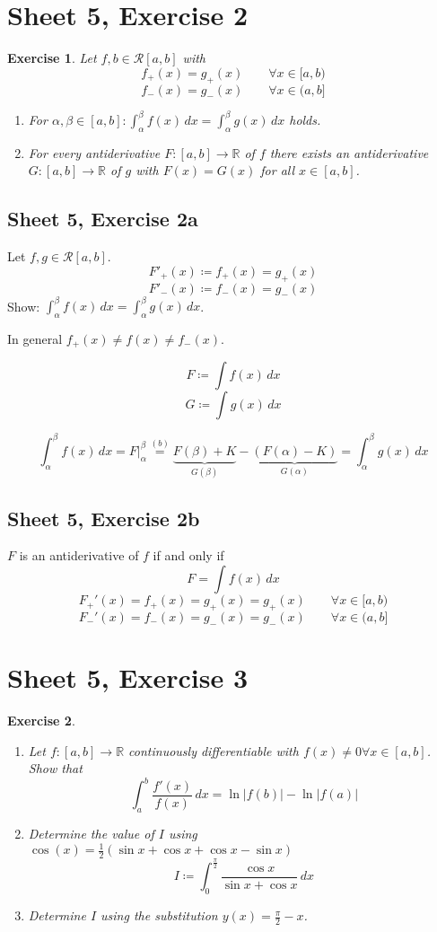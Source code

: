 \documentclass{article}
\newtheorem{ex}{Exercise} %
\newcommand{\card}[1]{\left|#1\right|}
\begin{document}
\section{Sheet 5, Exercise 2}
\begin{ex}
  Let $f, b \in \mathcal R[a,b]$ with
  \[ f_+(x) = g_+(x) \qquad \forall x \in [a,b) \]
  \[ f_-(x) = g_-(x) \qquad \forall x \in (a,b] \]
  \begin{enumerate}
    \item For $\alpha,\beta \in [a,b]: \int_\alpha^\beta f(x) \, dx = \int_\alpha^\beta g(x) \, dx$ holds.
    \item For every antiderivative $F: [a,b] \to \mathbb R$ of $f$ there exists an antiderivative $G: [a,b] \to \mathbb R$ of $g$ with $F(x) = G(x)$ for all $x \in [a,b]$.
  \end{enumerate}
\end{ex}

\subsection{Sheet 5, Exercise 2a}

Let $f,g \in \mathcal R[a,b]$.
\[ F'_+(x) \coloneqq f_+(x) = g_+(x) \]
\[ F'_-(x) \coloneqq f_-(x) = g_-(x) \]
Show: $\int_\alpha^\beta f(x) \, dx = \int_\alpha^\beta g(x) \, dx$.

In general $f_+(x) \neq f(x) \neq f_-(x)$.

\[ F \coloneqq \int f(x) \, dx \]
\[ G \coloneqq \int g(x) \, dx \]

\[ \int_\alpha^\beta f(x) \, dx = \left. F \right|_\alpha^\beta \overset{(b)}{=} \underbrace{F(\beta) + K}_{G(\beta)} - \underbrace{(F(\alpha) - K)}_{G(\alpha)} = \int_\alpha^\beta g(x) \, dx \]

\subsection{Sheet 5, Exercise 2b}
$F$ is an antiderivative of $f$ if and only if
\[ F = \int f(x) \, dx \]
\[ F_+'(x) = f_+(x) = g_+(x) = g_+(x) \qquad \forall x \in [a,b) \]
\[ F_-'(x) = f_-(x) = g_-(x) = g_-(x) \qquad \forall x \in (a,b] \]

\section{Sheet 5, Exercise 3}
\begin{ex}
  \begin{enumerate}
    \item Let $f: [a,b] \to \mathbb R$ continuously differentiable with $f(x) \neq 0 \forall x \in [a,b]$. Show that
      \[ \int_a^b \frac{f'(x)}{f(x)} \, dx = \ln{\card{f(b)}} - \ln{\card{f(a)}} \]
    \item Determine the value of $I$ using $\cos(x) = \frac12 (\sin{x} + \cos{x} + \cos{x} - \sin{x})$
      \[ I \coloneqq \int_0^{\frac\pi2} \frac{\cos{x}}{\sin{x} + \cos{x}} \, dx \]
    \item Determine $I$ using the substitution $y(x) = \frac\pi2 - x$.
  \end{enumerate}
\end{ex}
\end{document}
